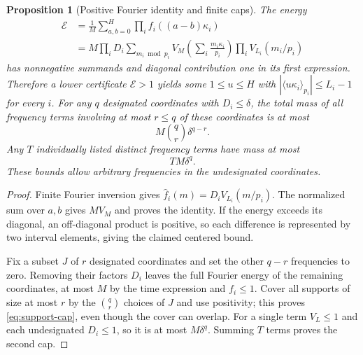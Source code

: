 \documentclass[11pt,a4paper]{article}
\newtheorem{proposition}[theorem]{Proposition}
\theoremstyle{definition}\newtheorem{question}[theorem]{Question}
\theoremstyle{remark}\newtheorem{remark}[theorem]{Remark}
\begin{document}
\begin{proposition}[Positive Fourier identity and finite caps]\label{prop:spectrum}
The energy
\begin{align}
 \mathcal E&=\frac1M\sum_{a,b=0}^H\prod_i f_i((a-b)\kappa_i)\nonumber\\
 &=M\prod_iD_i\sum_{m_i\bmod p_i}
 V_M\!\left(\sum_i\frac{m_i\kappa_i}{p_i}\right)
             \prod_iV_{L_i}(m_i/p_i)\label{eq:energy}
\end{align}
has nonnegative summands and diagonal contribution one in its first
expression. Therefore a lower certificate $\mathcal E>1$ yields
some $1\le u\le H$ with
$|\langle u\kappa_i\rangle_{p_i}|\le L_i-1$ for every $i$.
For any $q$ designated coordinates with $D_i\le\delta$, the total
mass of all frequency terms involving at most $r\le q$ of these
coordinates is at most
\begin{equation}\label{eq:support-cap}
 M\binom qr\delta^{q-r}.
\end{equation}
Any $T$ individually listed distinct frequency terms have mass at most
\begin{equation}\label{eq:term-cap}
 TM\delta^q.
\end{equation}
These bounds allow arbitrary frequencies in the undesignated coordinates.
\end{proposition}
\begin{proof}
Finite Fourier inversion gives $\widehat f_i(m)=D_iV_{L_i}(m/p_i)$.
The normalized sum over $a,b$ gives $M V_M$ and proves the identity.
If the energy exceeds its diagonal, an off-diagonal product is positive,
so each difference is represented by two interval elements, giving
the claimed centered bound.

Fix a subset $J$ of $r$ designated coordinates and set the other
$q-r$ frequencies to zero. Removing their factors $D_i$ leaves the
full Fourier energy of the remaining coordinates, at most $M$ by
the time expression and $f_i\le1$. Cover all supports of size at
most $r$ by the $\binom qr$ choices of $J$ and use positivity;
this proves \eqref{eq:support-cap}, even though the cover can overlap.
For a single term $V_L\le1$ and each undesignated $D_i\le1$,
so it is at most $M\delta^q$. Summing $T$ terms proves the second cap.
\end{proof}
\end{document}
